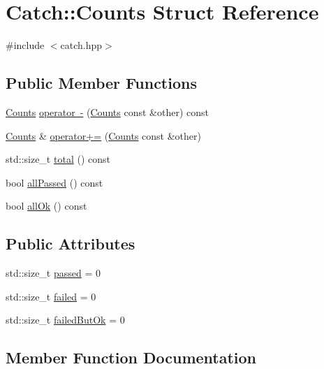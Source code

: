 \hypertarget{struct_catch_1_1_counts}{}\section{Catch\+::Counts Struct Reference}
\label{struct_catch_1_1_counts}


{\ttfamily \#include $<$catch.\+hpp$>$}

\subsection*{Public Member Functions}
\begin{DoxyCompactItemize}
\item 
\mbox{\hyperlink{struct_catch_1_1_counts}{Counts}} \mbox{\hyperlink{struct_catch_1_1_counts_a954a6bf7a975467774c5f2795bbda0ac}{operator -\/}} (\mbox{\hyperlink{struct_catch_1_1_counts}{Counts}} const \&other) const
\item 
\mbox{\hyperlink{struct_catch_1_1_counts}{Counts}} \& \mbox{\hyperlink{struct_catch_1_1_counts_a322a89475cd2cc039140ef371e973677}{operator+=}} (\mbox{\hyperlink{struct_catch_1_1_counts}{Counts}} const \&other)
\item 
std\+::size\+\_\+t \mbox{\hyperlink{struct_catch_1_1_counts_a94f969c09cf52d1339c085c9603cd1d3}{total}} () const
\item 
bool \mbox{\hyperlink{struct_catch_1_1_counts_a84999490e0ecaa3de5e121bf48eda1b3}{all\+Passed}} () const
\item 
bool \mbox{\hyperlink{struct_catch_1_1_counts_a33bd996e016030155b99fe1c51c08991}{all\+Ok}} () const
\end{DoxyCompactItemize}
\subsection*{Public Attributes}
\begin{DoxyCompactItemize}
\item 
std\+::size\+\_\+t \mbox{\hyperlink{struct_catch_1_1_counts_ad28daaf3de28006400208b6dd0c631e6}{passed}} = 0
\item 
std\+::size\+\_\+t \mbox{\hyperlink{struct_catch_1_1_counts_a19982a3817a3bc2c07f0290e71f497a3}{failed}} = 0
\item 
std\+::size\+\_\+t \mbox{\hyperlink{struct_catch_1_1_counts_ac090973a2ff51394cd452718e75c073e}{failed\+But\+Ok}} = 0
\end{DoxyCompactItemize}


\subsection{Member Function Documentation}
\mbox{\label{struct_catch_1_1_counts_a33bd996e016030155b99fe1c51c08991}} 
